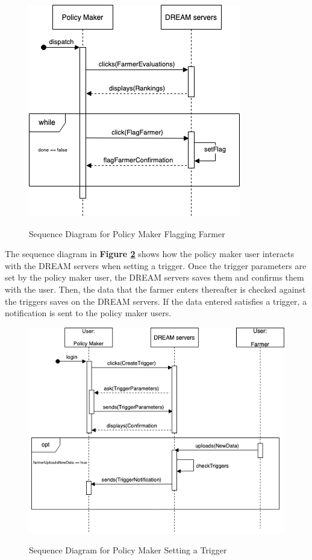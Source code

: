\begin{figure}[hbt!]
\centering
\includegraphics[scale=0.6]{Files/sequence_disgrams/thePNGs/policy_setFlag.png}\\
\caption{\label{fig:policySeqSetFlag}Sequence Diagram for Policy Maker Flagging Farmer}
\end{figure}



\begin{flushleft}
The sequence diagram in \textbf{Figure \ref{fig:policySeqSetTrig}} shows how the policy maker user interacts with the DREAM servers when setting a trigger. Once the trigger parameters are set by the policy maker user, the DREAM servers saves them and confirms them with the user. Then, the data that the farmer enters thereafter is checked against the triggers saves on the DREAM servers. If the data entered satisfies a trigger, a notification is sent to the policy maker users.
\end{flushleft}

\begin{figure}[hbt!]
\centering
\includegraphics[scale=0.6]{Files/sequence_disgrams/thePNGs/policy_setTrigger.png}\\
\caption{\label{fig:policySeqSetTrig}Sequence Diagram for Policy Maker Setting a Trigger}
\end{figure}


